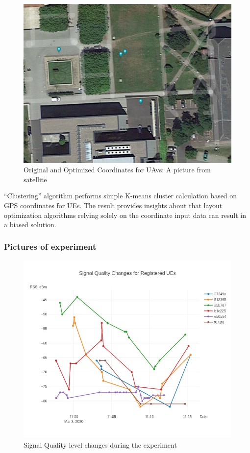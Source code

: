 \begin{figure}[H]
	\centering
	\includegraphics[width=\linewidth,keepaspectratio]{images/Expt4_Result_of_optimization_sattelite.png}
\caption{Original and Optimized Coordinates for UAvs: A picture from
satellite}
\end{figure}

``Clustering'' algorithm performs simple K-means cluster calculation
based on GPS coordinates for UEs. The result provides insights about
that layout optimization algorithms relying solely on the coordinate
input data can result in a biased solution.

\subsubsection{Pictures of experiment}\label{pictures-of-experiment}

\begin{figure}[H]
	\centering
	\includegraphics[width=\linewidth,keepaspectratio]{images/Exp4-Overall-Signal-Changes.png}
\caption{Signal Quality level changes during the experiment}
\end{figure}

